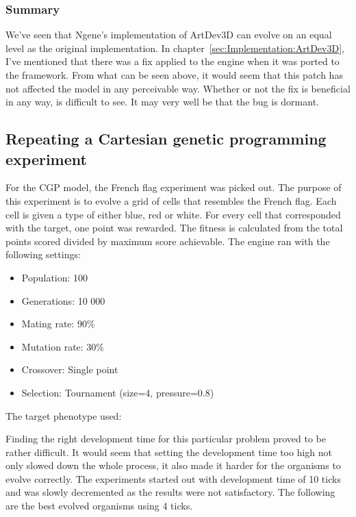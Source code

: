 \subsubsection{Summary}
We've seen that Ngene's implementation of ArtDev3D can evolve on an equal level as the original implementation. In chapter~\ref{sec:Implementation:ArtDev3D}, I've mentioned that there was a fix applied to the engine when it was ported to the framework. From what can be seen above, it would seem that this patch has not affected the model in any perceivable way. Whether or not the fix is beneficial in any way, is difficult to see. It may very well be that the bug is dormant.


\subsection{Repeating a Cartesian genetic programming experiment}
For the CGP model, the French flag experiment was picked out. The purpose of this experiment is to evolve a grid of cells that resembles the French flag. Each cell is given a type of either blue, red or white. For every cell that corresponded with the target, one point was rewarded. The fitness is calculated from the total points scored divided by maximum score achievable. The engine ran with the following settings:

\begin{itemize}
	\itemsep=-2pt
	\item Population: 100
	\item Generations: 10 000
	\item Mating rate: 90\%
	\item Mutation rate: 30\%
	\item Crossover: Single point
	\item Selection: Tournament (size=4, pressure=0.8)
\end{itemize}

The target phenotype used:

\begin{center}\end{center}

Finding the right development time for this particular problem proved to be rather difficult. It would seem that setting the development time too high not only slowed down the whole process, it also made it harder for the organisms to evolve correctly. The experiments started out with development time of 10 ticks and was slowly decremented as the results were not satisfactory. The following are the best evolved organisms using 4 ticks.


